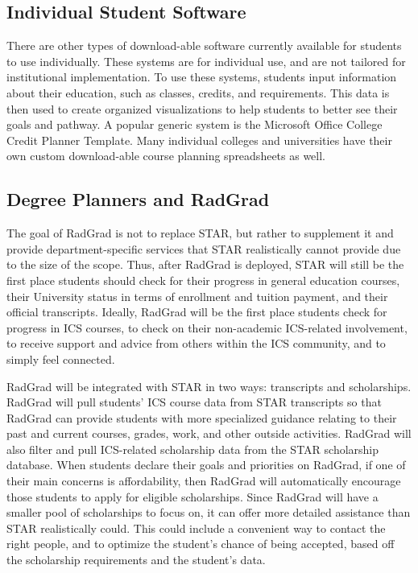 \subsection{Individual Student Software}
There are other types of download-able software currently available for students to use individually. These systems are for individual use, and are not tailored for institutional implementation. To use these systems, students input information about their education, such as classes, credits, and requirements. This data is then used to create organized visualizations to help students to better see their goals and pathway. A popular generic system is the Microsoft Office College Credit Planner Template. Many individual colleges and universities have their own custom download-able course planning spreadsheets as well.

\subsection{Degree Planners and RadGrad}
The goal of RadGrad is not to replace STAR, but rather to supplement it and provide department-specific services that STAR realistically cannot provide due to the size of the scope. Thus, after RadGrad is deployed, STAR will still be the first place students should check for their progress in general education courses, their University status in terms of enrollment and tuition payment, and their official transcripts. Ideally, RadGrad will be the first place students check for progress in ICS courses, to check on their non-academic ICS-related involvement, to receive support and advice from others within the ICS community, and to simply feel connected. 

RadGrad will be integrated with STAR in two ways: transcripts and scholarships. RadGrad will pull students' ICS course data from STAR transcripts so that RadGrad can provide students with more specialized guidance relating to their past and current courses, grades, work, and other outside activities. RadGrad will also filter and pull ICS-related scholarship data from the STAR scholarship database. When students declare their goals and priorities on RadGrad, if one of their main concerns is affordability, then RadGrad will automatically encourage those students to apply for eligible scholarships. Since RadGrad will have a smaller pool of scholarships to focus on, it can offer more detailed assistance than STAR realistically could. This could include a convenient way to contact the right people, and to optimize the student's chance of being accepted, based off the scholarship requirements and the student's data. 

